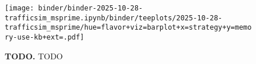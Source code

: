 \begin{figure}[h]
\centering
\begin{minipage}{0.62\linewidth}
    \centering
\texttt{[image: binder/binder-2025-10-28-trafficsim\_msprime.ipynb/binder/teeplots/2025-10-28-trafficsim\_msprime/hue=flavor+viz=barplot+x=strategy+y=memory-use-kb+ext=.pdf]}
\end{minipage}%
\begin{minipage}{0.38\linewidth}
\caption{%
\textbf{TODO.}
\footnotesize
TODO
}
\label{fig:msprime-memory-estimate}
\end{minipage}
\end{figure}
